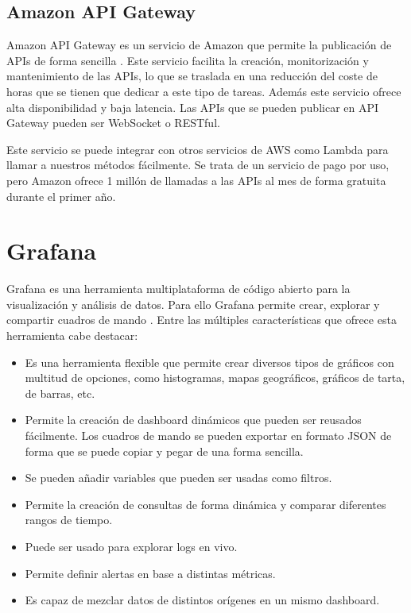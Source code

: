 \subsection{Amazon API Gateway}

Amazon API Gateway es un servicio de Amazon que permite la publicación de APIs de forma sencilla \cite{aws_apigateway}. Este servicio facilita la creación, monitorización y mantenimiento de las APIs, lo que se traslada en una reducción del coste de horas que se tienen que dedicar a este tipo de tareas. Además este servicio ofrece alta disponibilidad y baja latencia. Las APIs que se pueden publicar en API Gateway pueden ser WebSocket o RESTful.

Este servicio se puede integrar con otros servicios de AWS como Lambda para llamar a nuestros métodos fácilmente. Se trata de un servicio de pago por uso, pero Amazon ofrece 1 millón de llamadas a las APIs al mes de forma gratuita durante el primer año.

\section{Grafana}

Grafana es una herramienta multiplataforma de código abierto para la visualización y análisis de datos. Para ello Grafana permite crear, explorar y compartir cuadros de mando \cite{wiki_grafana}\cite{github_grafana}. Entre las múltiples características que ofrece esta herramienta cabe destacar:

\begin{itemize}
    \item Es una herramienta flexible que permite crear diversos tipos de gráficos con multitud de opciones, como histogramas, mapas geográficos, gráficos de tarta, de barras, etc.
    \item Permite la creación de dashboard dinámicos que pueden ser reusados fácilmente. Los cuadros de mando se pueden exportar en formato JSON de forma que se puede copiar y pegar de una forma sencilla.
    \item Se pueden añadir variables que pueden ser usadas como filtros.
    \item Permite la creación de consultas de forma dinámica y comparar diferentes rangos de tiempo.
    \item Puede ser usado para explorar logs en vivo.
    \item Permite definir alertas en base a distintas métricas.
    \item Es capaz de mezclar datos de distintos orígenes en un mismo dashboard.
\end{itemize}

